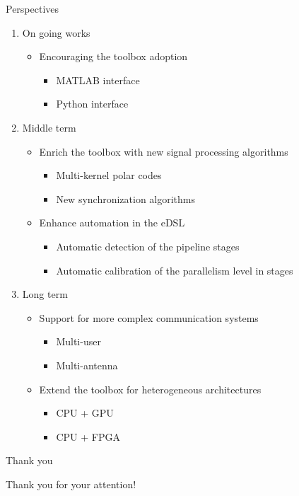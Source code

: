 \begin{frame}{Perspectives}
  \begin{enumerate}
    \item On going works
    \begin{itemize}
      \item Encouraging the toolbox adoption
      \begin{itemize}
        \item MATLAB interface
        \item Python interface
      \end{itemize}
    \end{itemize}
    \vspace{0.1cm}
    \pause
    \item Middle term
    \begin{itemize}
      \item Enrich the toolbox with new signal processing algorithms
      \begin{itemize}
        \item Multi-kernel polar codes
        \item New synchronization algorithms
      \end{itemize}
      \item Enhance automation in the eDSL
      \begin{itemize}
        \item Automatic detection of the pipeline stages
        \item Automatic calibration of the parallelism level in stages
      \end{itemize}
    \end{itemize}
    \vspace{0.1cm}
    \pause
    \item Long term
    \begin{itemize}
      \item Support for more complex communication systems
      \begin{itemize}
        \item Multi-user
        \item Multi-antenna
      \end{itemize}
      \item Extend the toolbox for heterogeneous architectures
      \begin{itemize}
        \item CPU + GPU
        \item CPU + FPGA
      \end{itemize}
    \end{itemize}
  \end{enumerate}
\end{frame}

\begin{frame}[c]{Thank you}
  \begin{center}
  {\Large Thank you for your attention!}
  \end{center}
\end{frame}